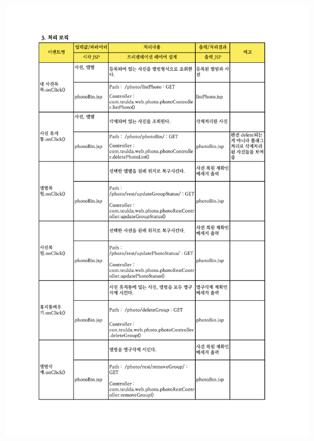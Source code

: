{{{{{{{{{{{{{{{{{{{{{{{{{{{{{{{{{{{{{{{{{{{{{{{{{{\includegraphics[width=20cm]{./Figure/Design/Display/photo/photo_06.pdf} \\
}}}}}}}}}}}}}}}}}}}}}}}}}}}}}}}}}}}}}}}}}}}}}}}}}}
